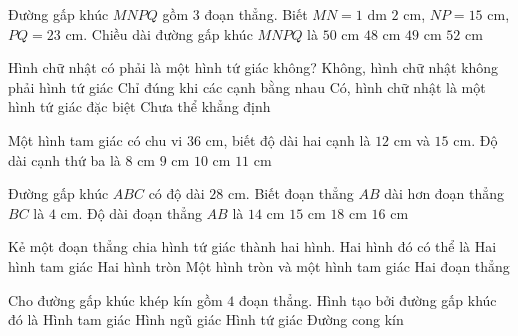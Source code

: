 \begin{ex} %
Đường gấp khúc $MNPQ$ gồm $3$ đoạn thẳng. Biết $MN = 1\text{ dm } 2\text{ cm}$, $NP = 15\text{ cm}$, $PQ = 23\text{ cm}$. Chiều dài đường gấp khúc $MNPQ$ là
\choice
{\True $50\text{ cm}$}
{$48\text{ cm}$}
{$49\text{ cm}$}
{$52\text{ cm}$}
\end{ex}

\begin{ex} %
Hình chữ nhật có phải là một hình tứ giác không?
\choice
{Không, hình chữ nhật không phải hình tứ giác}
{Chỉ đúng khi các cạnh bằng nhau}
{\True Có, hình chữ nhật là một hình tứ giác đặc biệt}
{Chưa thể khẳng định}
\end{ex}

\begin{ex} %
Một hình tam giác có chu vi $36\text{ cm}$, biết độ dài hai cạnh là $12\text{ cm}$ và $15\text{ cm}$. Độ dài cạnh thứ ba là
\choice
{$8\text{ cm}$}
{\True $9\text{ cm}$}
{$10\text{ cm}$}
{$11\text{ cm}$}
\end{ex}

\begin{ex} %
Đường gấp khúc $ABC$ có độ dài $28\text{ cm}$. Biết đoạn thẳng $AB$ dài hơn đoạn thẳng $BC$ là $4\text{ cm}$. Độ dài đoạn thẳng $AB$ là
\choice
{$14\text{ cm}$}
{$15\text{ cm}$}
{$18\text{ cm}$}
{\True $16\text{ cm}$}
\end{ex}

\begin{ex} %
Kẻ một đoạn thẳng chia hình tứ giác thành hai hình. Hai hình đó có thể là
\choice
{\True Hai hình tam giác}
{Hai hình tròn}
{Một hình tròn và một hình tam giác}
{Hai đoạn thẳng}
\end{ex}

\begin{ex} %
Cho đường gấp khúc khép kín gồm $4$ đoạn thẳng. Hình tạo bởi đường gấp khúc đó là
\choice
{Hình tam giác}
{Hình ngũ giác}
{\True Hình tứ giác}
{Đường cong kín}
\end{ex}

